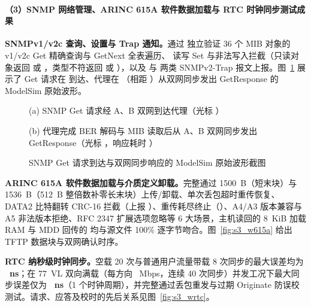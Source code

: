 \paragraph{（3）SNMP 网络管理、ARINC 615A 软件数据加载与 RTC 时钟同步测试成果}

\textbf{SNMPv1/v2c 查询、设置与 Trap 通知。}通过  独立验证 36 个 MIB 对象的 v1/v2c Get 精确查询与 GetNext 全表遍历、 读写 Set 与非法写入拦截（只读对象返回  或 ，类型不符返回  或 ），以及  与  两类 SNMPv2-Trap 报文上报。图~\ref{fig:s3_cap_snmp} 展示了 Get 请求在  到达、代理在 （相距 ）从双网同步发出 GetResponse 的 ModelSim 原始波形。

\begin{figure}[H]\centering
{}\par\vspace{2pt}
{\footnotesize (a) SNMP Get 请求经 A、B 双网到达代理（光标 ）\par}\vspace{4pt}
\par\vspace{2pt}
{\footnotesize (b) 代理完成 BER 解码与 MIB 读取后从 A、B 双网同步发出 GetResponse（光标 ，响应耗时 ）\par}
\caption{SNMP Get 请求到达与双网同步响应的 ModelSim 原始波形截图}\label{fig:s3_cap_snmp}
\end{figure}

\textbf{ARINC 615A 软件数据加载与介质定义卸载。}完整通过 1500~B（短末块）与 1536~B（512~B 整倍数补零长末块）上传/卸载、单次丢包超时重传恢复、DATA2 比特翻转 CRC-16 拦截（上报 ）、重传耗尽终止（）、A4/A3 版本兼容与 A5 非法版本拒绝、RFC 2347 扩展选项忽略等 6 大场景，主机读回的 8~KiB 加载 RAM 与 MDD 回传的  均与源文件 100\% 逐字节吻合。图~\ref{fig:s3_w615a} 给出 TFTP 数据块与双网确认时序。


\textbf{RTC 纳秒级时钟同步。}空载 20 次与普通用户流量带载 8 次同步的最大误差均为 \textbf{\RtcIdle~ns}；在 77~VL 双向满载（每方向 \Thru~Mbps，连续 40 次同步）并发工况下最大同步误差仅为 \textbf{\RtcLoad~ns}（1 个时钟周期），并完整通过丢包重发与过期 Originate 防误校测试。请求、应答及校时的先后关系见图~\ref{fig:s3_wrtc}。

